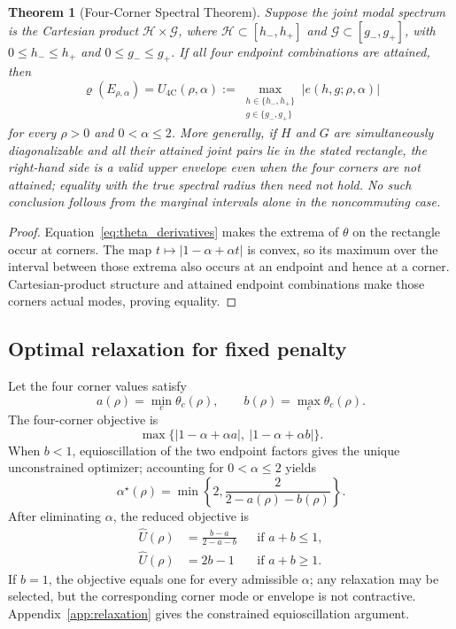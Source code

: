 \documentclass[pdflatex,iicol,sn-mathphys-num]{sn-jnl}
\newtheorem{theorem}{Theorem}[section]
\theoremstyle{definition}
\newcommand{\spr}{\varrho}
\newcommand{\Ufour}{U_{\mathrm{4C}}}
\begin{document}
\begin{theorem}[Four-Corner Spectral Theorem]\label{thm:fourcorner}
Suppose the joint modal spectrum is the Cartesian product
$\mathcal H\times\mathcal G$, where
$\mathcal H\subset[h_-,h_+]$ and
$\mathcal G\subset[g_-,g_+]$, with
$0\le h_-\le h_+$ and $0\le g_-\le g_+$. If all four endpoint combinations
are attained,
then
\begin{equation}
\spr(E_{\rho,\alpha})=
\Ufour(\rho,\alpha):=
\max_{\substack{h\in\{h_-,h_+\}\\g\in\{g_-,g_+\}}}
|e(h,g;\rho,\alpha)|
\label{eq:fourcorner}
\end{equation}
for every $\rho>0$ and $0<\alpha\le2$. More generally, if $H$ and $G$ are
simultaneously diagonalizable and all their attained joint pairs lie in the
stated rectangle, the right-hand side is a valid upper envelope even when the
four corners are not attained; equality with the true spectral radius then
need not hold. No such conclusion follows from the marginal intervals alone
in the noncommuting case.
\end{theorem}
\begin{proof}
Equation~\eqref{eq:theta_derivatives} makes the extrema of $\theta$ on the
rectangle occur at corners. The map
$t\mapsto|1-\alpha+\alpha t|$ is convex, so its maximum over the interval
between those extrema also occurs at an endpoint and hence at a corner.
Cartesian-product structure and attained endpoint combinations make those
corners actual modes, proving equality.
\end{proof}

\subsection{Optimal relaxation for fixed penalty}
Let the four corner values satisfy
\[
a(\rho)=\min_c\theta_c(\rho),\qquad
b(\rho)=\max_c\theta_c(\rho).
\]
The four-corner objective is
\[
\max\{|1-\alpha+\alpha a|,\ |1-\alpha+\alpha b|\}.
\]
When $b<1$, equioscillation of the two endpoint factors gives the unique
unconstrained optimizer; accounting for $0<\alpha\le2$ yields
\begin{equation}
\alpha^\star(\rho)=
\min\left\{2,\frac{2}{2-a(\rho)-b(\rho)}\right\}.
\label{eq:alpha_star}
\end{equation}
After eliminating $\alpha$, the reduced objective is
\begin{align}
\widehat U(\rho)&=\frac{b-a}{2-a-b}
&&\text{if }a+b\le1,\label{eq:reduced_objective}\\
\widehat U(\rho)&=2b-1
&&\text{if }a+b\ge1.\nonumber
\end{align}
If $b=1$, the objective equals one for every admissible $\alpha$; any
relaxation may be selected, but the corresponding corner mode or envelope is
not contractive.
Appendix~\ref{app:relaxation} gives the constrained equioscillation argument.
\end{document}
